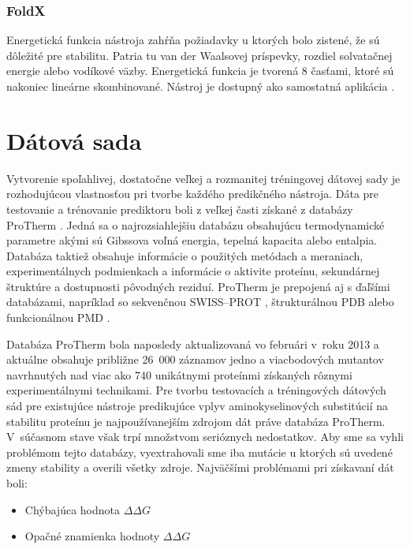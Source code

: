 \subsection{FoldX}

Energetická funkcia nástroja zahŕňa požiadavky u ktorých bolo zistené, že sú dôležité pre stabilitu. Patria tu van der Waalsovej príspevky, rozdiel solvatačnej energie alebo vodíkové väzby. Energetická funkcia je tvorená 8 časťami, ktoré sú nakoniec lineárne skombinované. Nástroj je dostupný ako samostatná aplikácia \cite{foldx}.


\chapter{Dátová sada}

Vytvorenie spoľahlivej, dostatočne veľkej a rozmanitej tréningovej dátovej sady je rozhodujúcou vlastnosťou pri tvorbe každého predikčného nástroja. Dáta pre testovanie a trénovanie prediktoru boli z veľkej časti získané z databázy ProTherm \cite{protherm}. Jedná sa o najrozsiahlejšiu databázu obsahujúcu termodynamické parametre akými sú Gibssova voľná energia, tepelná kapacita alebo entalpia. Databáza taktiež obsahuje informácie o použitých metódach a meraniach, experimentálnych podmienkach a informácie o aktivite proteínu, sekundárnej štruktúre a dostupnosti pôvodných reziduí. ProTherm je prepojená aj s ďaľšími databázami, napríklad so sekvenčnou SWISS--PROT \cite{swissprot}, štrukturálnou PDB \cite{pdb} alebo funkcionálnou PMD \cite{pmd}.


Databáza ProTherm bola naposledy aktualizovaná vo februári v roku 2013 a aktuálne obsahuje približne 26 000 záznamov jedno a viacbodových mutantov navrhnutých nad viac ako 740 unikátnymi proteínmi získaných rôznymi experimentálnymi technikami. Pre tvorbu testovacích a tréningových dátových sád pre existujúce nástroje predikujúce vplyv aminokyselinových substitúcií na stabilitu proteínu je najpoužívanejším zdrojom dát práve databáza ProTherm. V súčasnom stave však trpí množstvom serióznych nedostatkov. Aby sme sa vyhli problémom tejto databázy, vyextrahovali sme iba mutácie u ktorých sú uvedené zmeny stability a overili všetky zdroje. Najväčšími problémami pri získavaní dát boli:
\begin{itemize}
	\item Chýbajúca hodnota $\Delta\Delta G$
	\item Opačné znamienka hodnoty $\Delta\Delta G$ 
\end{itemize}

